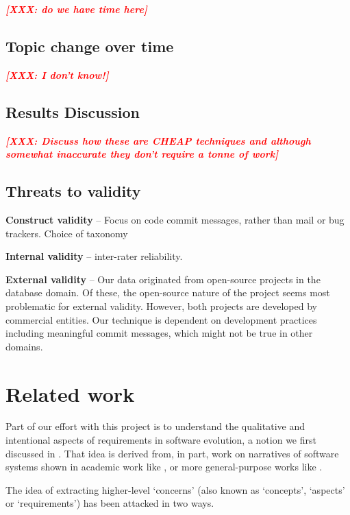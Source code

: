 \documentclass{acm_proc_article-sp}
\newcommand{\XXX}[1]{\textcolor{red}{{\it \textbf{[XXX: #1]}}}}
\begin{document}
\XXX{do we have time here}

\subsection{Topic change over time}

\XXX{I don't know!}

\subsection{Results Discussion}

\XXX{Discuss how these are CHEAP techniques and although somewhat inaccurate they don't require a tonne of work}

\subsection{Threats to validity}
\textbf{Construct validity} -- Focus on code commit messages, rather than mail or bug trackers. Choice of taxonomy

\textbf{Internal validity} -- inter-rater reliability.

\textbf{External validity} -- Our data originated from open-source projects in the database domain. Of these, the open-source nature of the project seems most problematic for external validity. However, both projects are developed by commercial entities. Our technique is dependent on development practices including meaningful commit messages, which might not be true in other domains.

\section{Related work}

Part of our effort with this project is to understand the qualitative and intentional aspects of requirements in software evolution, a notion we first discussed in \cite{ernst07icsm}. That idea is derived from, in part, work on narratives of software systems shown in academic work like \cite{anton01}, or more general-purpose works like \cite{waldo93}.

The idea of extracting higher-level `concerns' (also known as `concepts', `aspects' or `requirements') has been attacked in two ways.
\end{document}
